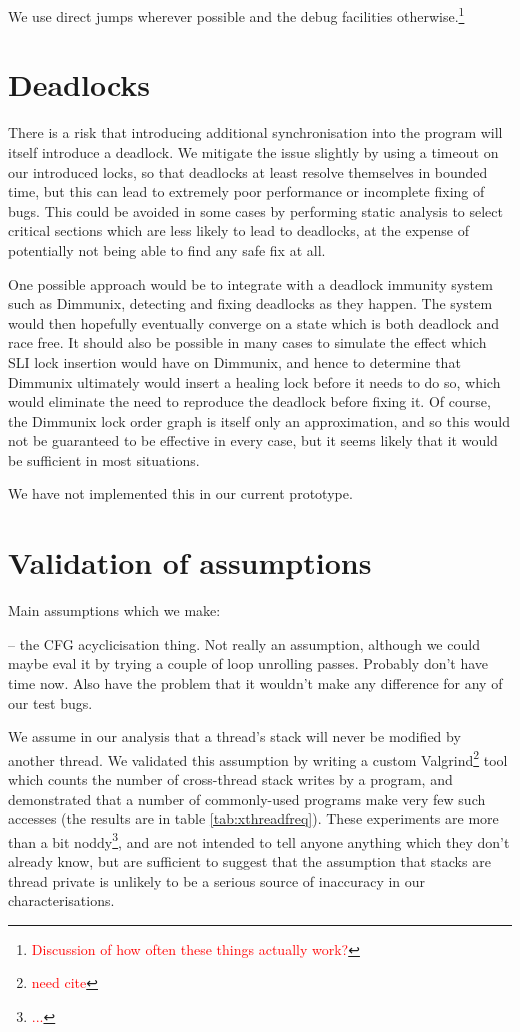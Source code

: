 \documentclass[10pt,twocolumn,preprint,natbib,authoryear]{sigplanconf}
\newcommand{\editorial}[1]{\textcolor{red}{\footnote{\textcolor{red}{#1}}}}
\newcommand{\needCite}{\editorial{need cite}}
\begin{document}
We use direct jumps wherever possible and the debug facilities
otherwise.\editorial{Discussion of how often these things actually
  work?}

\section{Deadlocks}
\label{sect:deadlocks}

There is a risk that introducing additional synchronisation into the
program will itself introduce a deadlock.  We mitigate the issue
slightly by using a timeout on our introduced locks, so that deadlocks
at least resolve themselves in bounded time, but this can lead to
extremely poor performance or incomplete fixing of bugs.  This could
be avoided in some cases by performing static analysis to select
critical sections which are less likely to lead to deadlocks, at the
expense of potentially not being able to find any safe fix at all.

One possible approach would be to integrate with a deadlock immunity
system such as Dimmunix\cite{Jula2008}, detecting and fixing deadlocks
as they happen.  The system would then hopefully eventually converge
on a state which is both deadlock and race free.  It should also be
possible in many cases to simulate the effect which SLI lock insertion
would have on Dimmunix, and hence to determine that Dimmunix
ultimately would insert a healing lock before it needs to do so, which
would eliminate the need to reproduce the deadlock before fixing it.
Of course, the Dimmunix lock order graph is itself only an
approximation, and so this would not be guaranteed to be effective in
every case, but it seems likely that it would be sufficient in most
situations.

We have not implemented this in our current prototype.

\section{Validation of assumptions}
\label{sect:validassumpt}

Main assumptions which we make:

-- the CFG acyclicisation thing.  Not really an assumption, although
we could maybe eval it by trying a couple of loop unrolling passes.
Probably don't have time now.  Also have the problem that it wouldn't
make any difference for any of our test bugs.

We assume in our analysis that a thread's stack will never be modified
by another thread.  We validated this assumption by writing a custom
Valgrind\needCite{} tool which counts the number of cross-thread stack
writes by a program, and demonstrated that a number of commonly-used
programs make very few such accesses (the results are in table
\ref{tab:xthreadfreq}).  These experiments are more than a bit
noddy\editorial{...}, and are not intended to tell anyone anything
which they don't already know, but are sufficient to suggest that the
assumption that stacks are thread private is unlikely to be a serious
source of inaccuracy in our characterisations.
\end{document}
